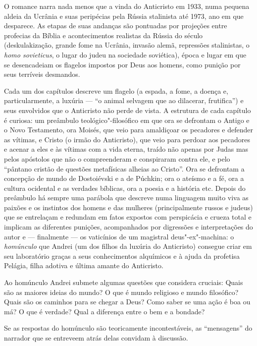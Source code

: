 O romance narra nada menos que a vinda do Anticristo em 1933, numa
pequena aldeia da Ucrânia e suas peripécias pela Rússia stalinista até
1973, ano em que desparece. As etapas de suas andanças são pontuadas por
projeções entre profecias da Bíblia e acontecimentos realistas da Rússia
do século  (deskulakização, grande fome na Ucrânia, invasão alemã,
repressões stalinistas, o \emph{homo sovieticus}, o lugar do judeu na
sociedade soviética), época e lugar em que se desencadeiam os flagelos
impostos por Deus aos homens, como punição por seus terríveis desmandos.

Cada um dos capítulos descreve um flagelo (a espada, a fome, a doença e,
particularmente, a luxúria --- ``o animal selvagem que ao dilacerar,
frutifica'') e seus envolvidos que o Anticristo não perde de vista. A
estrutura de cada capítulo é curiosa: um preâmbulo teológico"-filosófico
em que ora se defrontam o Antigo e o Novo Testamento, ora Moisés, que
veio para amaldiçoar os pecadores e defender as vítimas, e Cristo (o
irmão do Anticristo), que veio para perdoar aos pecadores e acenar a
eles e às vítimas com a vida eterna, traído não apenas por Judas mas
pelos apóstolos que não o compreenderam e conspiraram contra ele, e pelo
``pântano cristão de questões metafísicas alheias ao Cristo''. Ora se
defrontam a concepção de mundo de Dostoiévski e a de Púchkin; ora o ateísmo e a fé,
ora a cultura ocidental e as verdades bíblicas, ora a poesia e a
história etc. Depois do preâmbulo há sempre uma parábola que descreve
numa linguagem muito viva as paixões e os instintos dos homens e das
mulheres (principalmente russos e judeus) que se entrelaçam e redundam
em fatos expostos com perspicácia e crueza total e implicam as
diferentes punições, acompanhados por digressões e interpretações do
autor e --- finalmente --- os vaticínios de um magistral deus"-ex"-machina:
o \emph{homúnculo} que Andrei (um dos filhos da luxúria do Anticristo)
consegue criar em seu laboratório graças a seus conhecimentos alquímicos
e à ajuda da profetisa Pelágia, filha adotiva e última amante do
Anticristo.

Ao homúnculo Andrei submete algumas questões que considera cruciais: Quais são
as maiores ideias do mundo? O que é mundo religioso e mundo filosófico?
Quais são os caminhos para se chegar a Deus? Como saber se uma ação é
boa ou má? O que é verdade? Qual a diferença entre o bem e a bondade?

Se as respostas do homúnculo são teoricamente incontestáveis, as
``mensagens'' do narrador que se entreveem atrás delas convidam à
discussão.


